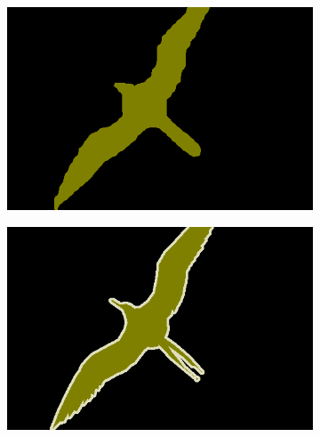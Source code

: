 \documentclass{article} %
\begin{document}
\begin{figure}[t]
\begin{subfigure}[b]{0.19\linewidth}
  \end{subfigure}
  \begin{subfigure}[b]{0.19\linewidth}
    \includegraphics[width=\textwidth]{figs/ab/step8_voc/2007_002094}
  \end{subfigure}
  \begin{subfigure}[b]{0.19\linewidth}
    \includegraphics[width=\textwidth]{figs/ab/gt/2007_002094}
  \end{subfigure}


\end{figure}
\end{document}
